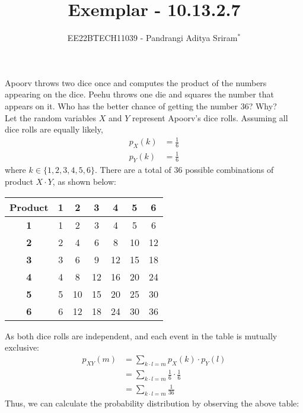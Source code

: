 \documentclass[journal,12pt,twocolumn]{IEEEtran}
\theoremstyle{remark}
\begin{document}

\vspace{3cm}

\title{Exemplar - 10.13.2.7}
\author{EE22BTECH11039 - Pandrangi Aditya Sriram$^{*}$%
}
\maketitle
\newpage
\bigskip

\renewcommand{\thefigure}{\theenumi}
\renewcommand{\thetable}{\theenumi}

Apoorv throws two dice once and computes the product of the numbers appearing
on the dice. Peehu throws one die and squares the number that appears on it. Who
has the better chance of getting the number 36? Why?\\\solution
Let the random variables $X$ and $Y$ represent Apoorv's dice rolls. Assuming all dice rolls are equally likely,
\begin{align}
p_X(k) &= \frac{1}{6}\\
p_Y(k) &= \frac{1}{6}
\end{align}
where $k \in \{1, 2, 3, 4, 5, 6\}$. There are a total of 36 possible combinations of product $X \cdot Y$, as shown below:\\
\begin{center}
\begin{tabular}{c c c c c c c}
 \textbf{Product} & \textbf{1} & \textbf{2} & \textbf{3} & \textbf{4} & \textbf{5} & \textbf{6} \\
 \hline
 \textbf{1} & 1 & 2 & 3 & 4 & 5 & 6 \\
 \textbf{2} & 2 & 4 & 6 & 8 & 10 & 12 \\
 \textbf{3} & 3 & 6 & 9 & 12 & 15 & 18 \\
 \textbf{4} & 4 & 8 & 12 & 16 & 20 & 24 \\
 \textbf{5} & 5 & 10 & 15 & 20 & 25 & 30 \\
 \textbf{6} & 6 & 12 & 18 & 24 & 30 & 36 
\end{tabular}
\end{center}
As both dice rolls are independent, and each event in the table is mutually exclusive:
\begin{align}
p_{XY}(m) &= \sum_{k \cdot l = m}^{} p_X(k) \cdot p_Y(l)\\
&= \sum_{k \cdot l = m}^{} \frac{1}{6} \cdot \frac{1}{6}\\
&= \sum_{k \cdot l = m}^{} \frac{1}{36}
\end{align}
Thus, we can calculate the probability distribution by observing the above table:
\end{document}
